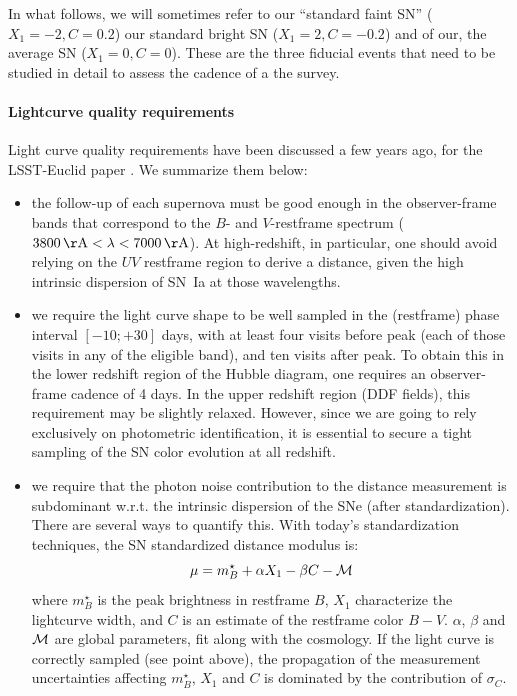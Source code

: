 \documentclass[\docopts]{\docclass}
\begin{document}
In what follows, we will sometimes refer to our ``standard faint SN''
($X_1=-2, C=0.2$) our standard bright SN ($X_1=2, C=-0.2$) and of our,
the average SN ($X_1=0, C=0$). These are the three fiducial events
that need to be studied in detail to assess the cadence of a the
survey.


\paragraph{Lightcurve quality requirements} Light curve quality
requirements have been discussed a few years ago, for the LSST-Euclid
paper \citep{2014A&A...572A..80A}. We summarize them below:

\begin{itemize}
\item the follow-up of each supernova must be good enough in the
  observer-frame bands that correspond to the $B$- and $V$-restframe
  spectrum ($3800 \angstrom < \lambda < 7000 \angstrom$).  At
  high-redshift, in particular, one should avoid relying on the $UV$
  restframe region to derive a distance, given the high intrinsic
  dispersion of SN~Ia at those wavelengths.
  
\item we require the light curve shape to be well sampled in the
  (restframe) phase interval $[-10;+30]$ days, with at least four
  visits before peak (each of those visits in any of the eligible
  band), and ten visits after peak.  To obtain this in the lower
  redshift region of the Hubble diagram, one requires an
  observer-frame cadence of 4 days.  In the upper redshift region (DDF
  fields), this requirement may be slightly relaxed. However, since we
  are going to rely exclusively on photometric identification, it is
  essential to secure a tight sampling of the SN color evolution at
  all redshift.
  
\item we require that the photon noise contribution to the distance
  measurement is subdominant w.r.t. the intrinsic dispersion of the
  SNe (after standardization).  There are several ways to quantify
  this.  With today's standardization techniques, the SN standardized
  distance modulus is:
  \begin{equation}
    \mu = m^\star_B + \alpha X_1 - \beta C - \cal{M}
  \end{equation}
  where $m^\star_B$ is the peak brightness in restframe $B$, $X_1$
  characterize the lightcurve width, and $C$ is an estimate of the
  restframe color $B-V$. $\alpha$, $\beta$ and $\cal{M}$ are global
  parameters, fit along with the cosmology. If the light curve is
  correctly sampled (see point above), the propagation of the
  measurement uncertainties affecting $m^\star_B$, $X_1$ and $C$ is
  dominated by the contribution of $\sigma_C$. 
  

\end{itemize}
\end{document}
